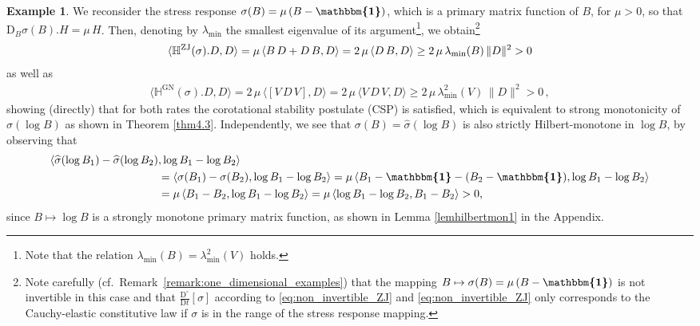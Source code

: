 \documentclass[10pt]{article}
\newcounter{theoremCounter}
\numberwithin{theoremCounter}{section}
\theoremstyle{plain}
\theoremstyle{definition}
\newtheorem{example}[theoremCounter]{Example}
\newcommand{\id}{{\boldsymbol{\mathbbm{1}}}}
\newcommand{\norm}[1]{\lVert #1 \rVert}
\newcommand{\DD}{\mathrm{D}}
\DeclareMathOperator{\ZJ}{ZJ}
\DeclareMathOperator{\GN}{GN}
\def\H{\mathbb{H}}
\numberwithin{equation}{section}
\begin{document}
\begin{example} \label{example5.1}
We reconsider the stress response $\sigma(B) = \mu \, (B - \id)$, which is a primary matrix function of $B$, for $\mu > 0$, so that $\DD_B\sigma(B) . H = \mu \, H$. Then, denoting by $\lambda_{\min}$ the smallest eigenvalue of its argument\footnote
{
Note that the relation $\lambda_{\min}(B) = \lambda_{\min}^2(V)$ holds.
},
we obtain\footnote{Note carefully (cf.~Remark~\ref{remark:one_dimensional_examples}) that the mapping $B\mapsto\sigma(B)=\mu\,(B-\id)$ is not invertible in this case and that $\frac{\DD^{\circ}}{\DD t}[\sigma]$ according to \eqref{eq:non_invertible_ZJ} and \eqref{eq:non_invertible_ZJ} only corresponds to the Cauchy-elastic constitutive law if $\sigma$ is in the range of the stress response mapping.}
	\begin{align}
	\label{eq:non_invertible_ZJ}
	\langle \H^{\ZJ}(\sigma).D, D \rangle = \mu \, \langle B \, D + D \, B , D \rangle = 2 \, \mu \, \langle D \, B , D \rangle \geq 2\,\mu\, \lambda_{\rm min}(B)\, \|D\|^2> 0
	\end{align}
as well as
	\begin{align}
	\label{eq:non_invertible_GN}
	\langle \H^{\GN}(\sigma).D,D \rangle = 2 \, \mu \, \langle [V \, D \, V], D \rangle = 2 \, \mu \, \langle V \, D \, V , D \rangle \ge 2 \, \mu \, \lambda_{\min}^2(V) \, \norm{D}^2 > 0\,,
	\end{align}
showing (directly) that for both rates the corotational stability postulate (CSP) is satisfied, which is equivalent to strong monotonicity of $\widehat \sigma(\log B)$ as shown in Theorem \ref{thm4.3}. Independently, we see that $\sigma(B) = \widehat \sigma(\log B)$ is also strictly Hilbert-monotone in $\log B$, by observing that
	\begin{equation}
	\label{eqmonotonesig}
	\begin{alignedat}{2}
	\langle \widehat{\sigma}(\log B_1) - \widehat{\sigma}(\log B_2)&, \log B_1 - \log B_2 \rangle \\
	&= \langle \sigma(B_1) - \sigma(B_2) , \log B_1 - \log B_2 \rangle = \mu \, \langle B_1 - \id - (B_2 - \id), \log B_1 - \log B_2 \rangle \\
	&= \mu \, \langle B_1 - B_2, \log B_1 - \log B_2 \rangle = \mu \, \langle \log B_1 - \log B_2, B_1 - B_2 \rangle > 0,
	\end{alignedat}
	\end{equation}
since $B \mapsto \log B$ is a strongly monotone primary matrix function, as shown in Lemma \ref{lemhilbertmon1} in the Appendix.
\end{example}
\end{document}
